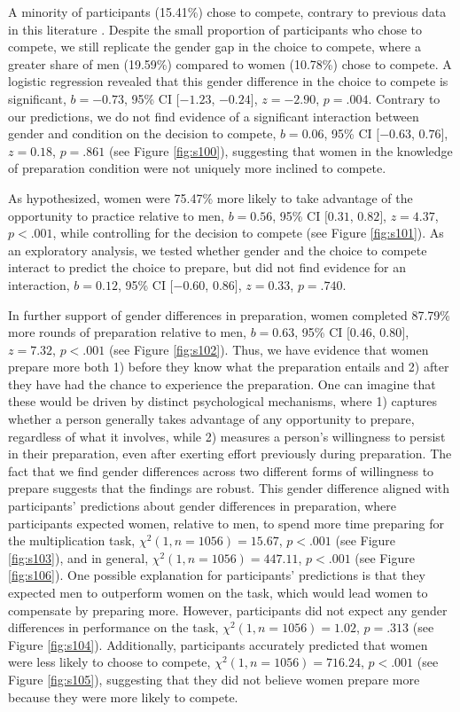 \documentclass[a4paper, nobind]{templates/ociamthesis}
\begin{document}
A minority of participants (15.41\%) chose to compete, contrary to previous data in this literature \autocite{Niederle2007}. Despite the small proportion of participants who chose to compete, we still replicate the gender gap in the choice to compete, where a greater share of men (19.59\%) compared to women (10.78\%) chose to compete. A logistic regression revealed that this gender difference in the choice to compete is significant, \(b = -0.73\), 95\% CI \([-1.23\), \(-0.24]\), \(z = -2.90\), \(p = .004\). Contrary to our predictions, we do not find evidence of a significant interaction between gender and condition on the decision to compete, \(b = 0.06\), 95\% CI \([-0.63\), \(0.76]\), \(z = 0.18\), \(p = .861\) (see Figure \ref{fig:s100}), suggesting that women in the knowledge of preparation condition were not uniquely more inclined to compete.

As hypothesized, women were 75.47\% more likely to take advantage of the opportunity to practice relative to men, \(b = 0.56\), 95\% CI \([0.31\), \(0.82]\), \(z = 4.37\), \(p < .001\), while controlling for the decision to compete (see Figure \ref{fig:s101}). As an exploratory analysis, we tested whether gender and the choice to compete interact to predict the choice to prepare, but did not find evidence for an interaction, \(b = 0.12\), 95\% CI \([-0.60\), \(0.86]\), \(z = 0.33\), \(p = .740\).

In further support of gender differences in preparation, women completed 87.79\% more rounds of preparation relative to men, \(b = 0.63\), 95\% CI \([0.46\), \(0.80]\), \(z = 7.32\), \(p < .001\) (see Figure \ref{fig:s102}). Thus, we have evidence that women prepare more both 1) before they know what the preparation entails and 2) after they have had the chance to experience the preparation. One can imagine that these would be driven by distinct psychological mechanisms, where 1) captures whether a person generally takes advantage of any opportunity to prepare, regardless of what it involves, while 2) measures a person's willingness to persist in their preparation, even after exerting effort previously during preparation. The fact that we find gender differences across two different forms of willingness to prepare suggests that the findings are robust. This gender difference aligned with participants' predictions about gender differences in preparation, where participants expected women, relative to men, to spend more time preparing for the multiplication task, \(\chi^2(1, n = 1056) = 15.67\), \(p < .001\) (see Figure \ref{fig:s103}), and in general, \(\chi^2(1, n = 1056) = 447.11\), \(p < .001\) (see Figure \ref{fig:s106}). One possible explanation for participants' predictions is that they expected men to outperform women on the task, which would lead women to compensate by preparing more. However, participants did not expect any gender differences in performance on the task, \(\chi^2(1, n = 1056) = 1.02\), \(p = .313\) (see Figure \ref{fig:s104}). Additionally, participants accurately predicted that women were less likely to choose to compete, \(\chi^2(1, n = 1056) = 716.24\), \(p < .001\) (see Figure \ref{fig:s105}), suggesting that they did not believe women prepare more because they were more likely to compete.
\end{document}
